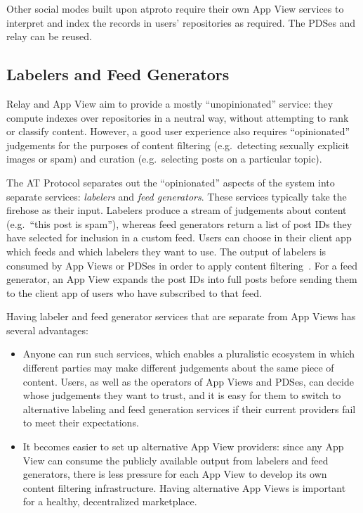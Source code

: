 \documentclass[sigconf]{acmart}
\begin{document}
Other social modes built upon atproto require their own App View services to interpret and index the records in users' repositories as required.
The PDSes and relay can be reused.


\subsection{Labelers and Feed Generators}\label{sec:labeling}

Relay and App View aim to provide a mostly ``unopinionated'' service: they compute indexes over repositories in a neutral way, without attempting to rank or classify content.
However, a good user experience also requires ``opinionated'' judgements for the purposes of content filtering (e.g.\ detecting sexually explicit images or spam) and curation (e.g.\ selecting posts on a particular topic).

The AT Protocol separates out the ``opinionated'' aspects of the system into separate services: \emph{labelers} and \emph{feed generators}.
These services typically take the firehose as their input.
Labelers produce a stream of judgements about content (e.g.\ ``this post is spam''), whereas feed generators return a list of post IDs they have selected for inclusion in a custom feed.
Users can choose in their client app which feeds and which labelers they want to use.
The output of labelers is consumed by App Views or PDSes in order to apply content filtering~\cite{Labeling}.
For a feed generator, an App View expands the post IDs into full posts before sending them to the client app of users who have subscribed to that feed.

Having labeler and feed generator services that are separate from App Views has several advantages:
\begin{itemize}
    \item Anyone can run such services, which enables a pluralistic ecosystem in which different parties may make different judgements about the same piece of content.
        Users, as well as the operators of App Views and PDSes, can decide whose judgements they want to trust, and it is easy for them to switch to alternative labeling and feed generation services if their current providers fail to meet their expectations.
    \item It becomes easier to set up alternative App View providers: since any App View can consume the publicly available output from labelers and feed generators, there is less pressure for each App View to develop its own content filtering infrastructure.
        Having alternative App Views is important for a healthy, decentralized marketplace.
\end{itemize}
\end{document}
